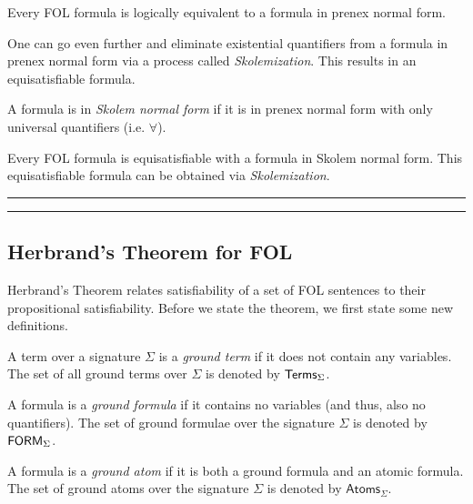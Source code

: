 \documentclass[11pt,usenames, dvipsnames]{article}
\begin{document}
\begin{claim}
  Every FOL formula is logically equivalent to a formula in prenex normal form.
\end{claim}

One can go even further and eliminate existential quantifiers from a formula in prenex normal form via a process called \emph{Skolemization}. This results in an equisatisfiable formula.

\begin{definition}
  A formula is in \emph{Skolem normal form} if it is in prenex normal form with only universal quantifiers (i.e. $\forall$).
\end{definition}

\begin{claim}[Skolemization]
  Every FOL formula is equisatisfiable with a formula in Skolem normal form. This equisatisfiable formula can be obtained via \emph{Skolemization}.
\end{claim}

\vspace{5truemm}
\hrule
\hrule

\subsection{\large \centering Herbrand's Theorem for FOL}
\noindent

Herbrand's Theorem relates satisfiability of a set of FOL sentences to their propositional satisfiability. Before we state the theorem, we first state some new definitions.

\begin{definition}
  A term over a signature $\Sigma$ is a \emph{ground term} if it does not contain any variables. The set of all ground terms over $\Sigma$ is denoted by $\mathsf{Terms}_{\Sigma}$.
\end{definition}

\begin{definition}  
  A formula is a \emph{ground formula} if it contains no variables (and thus, also no quantifiers). The set of ground formulae over the signature $\Sigma$ is denoted by $\mathsf{FORM}_{\Sigma}$.
\end{definition}
  
\begin{definition}
  A formula is a \emph{ground atom} if it is both a ground formula and an atomic formula. The set of ground atoms over the signature $\Sigma$ is denoted by $\mathsf{Atoms}_{\Sigma}$.
\end{definition}
\end{document}
